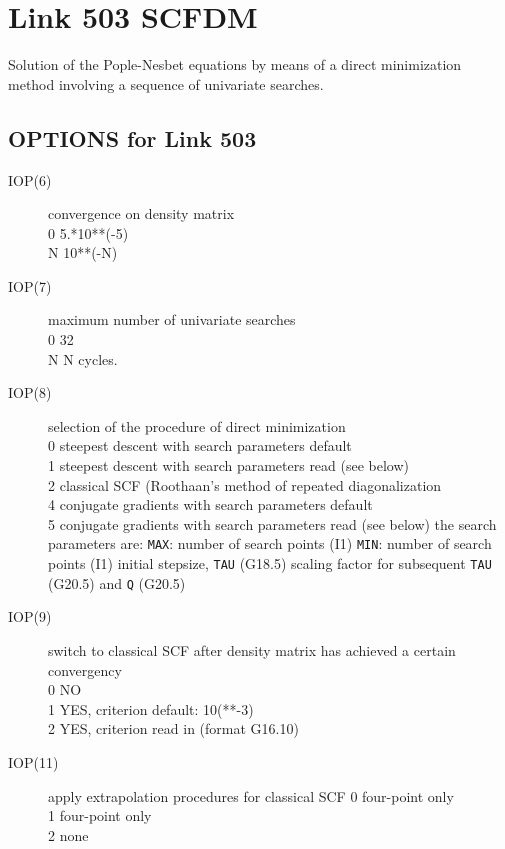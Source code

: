 \section{\sf Link 503  SCFDM}
Solution of the Pople-Nesbet equations by means of a direct
minimization method involving a sequence of univariate searches.  
\subsection{\sf OPTIONS for Link 503}
\begin{description}
\item[IOP(6)]  convergence on density matrix  \\
0  5.*10**(-5) \\
N 10**(-N)  \\
\item[IOP(7)]  maximum number of univariate searches  \\
0  32 \\
N N cycles.  \\
\item[IOP(8)]  selection of the procedure of direct minimization  \\
0  steepest descent with search parameters default \\
1  steepest descent with search parameters read (see below) \\
2  classical SCF (Roothaan's method of repeated diagonalization \\
4  conjugate gradients with search parameters default \\
5  conjugate gradients with search parameters read (see below) 
the search parameters are: {\tt MAX}: number of search points (I1)
{\tt MIN}: number of search points (I1)
initial stepsize, {\tt TAU} (G18.5)
scaling factor for subsequent {\tt TAU} (G20.5) and
{\tt Q} (G20.5)  \\
\item[IOP(9)]  switch to classical SCF after density matrix has
achieved a certain convergency  \\
0  NO \\
1  YES, criterion default: 10(**-3) \\
2  YES, criterion read in (format G16.10) \\
\item[IOP(11)]  apply extrapolation procedures for classical SCF
0  four-point only \\
1  four-point only \\
2  none \\

\end{description}

